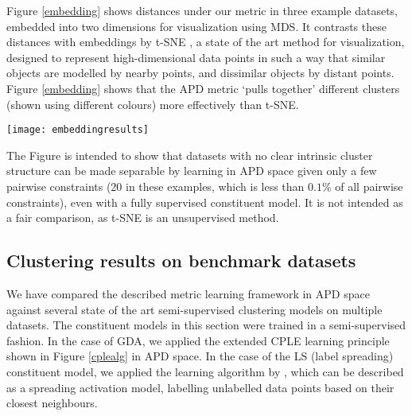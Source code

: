 Figure \ref{embedding} shows distances under our metric in three example datasets, embedded into two dimensions for visualization using MDS. It contrasts these distances with embeddings by t-SNE \citep{van2008visualizing}, a state of the art method for visualization, designed to represent high-dimensional data points in such a way that similar objects are modelled by nearby points, and dissimilar objects by distant points. Figure \ref{embedding} shows that the APD metric `pulls together' different clusters (shown using different colours) more effectively than t-SNE. 

\begin{figure*}[t]
	\centering
	
	\texttt{[image: embeddingresults]}%
	
	\caption[Embedding of pairwise distances as suggested by our metric learning approach]{Embedding of pairwise distances as suggested by our metric learning approach (top) and by t-SNE (bottom) on the COIL-3 dataset (128x128px images of 3 similar-looking toy cars) used by \citep{zeng2012semi}, the ionosphere and wheat datasets from the UCI machine learning repository, and the lymphoma microarray dataset obtained from the Broad Institute. The APD plot was created using supervised GDA as the constituent model.}
	\label{embedding} 
\end{figure*}

The Figure is intended to show that datasets with no clear intrinsic cluster structure can be made separable by learning in APD space given only a few pairwise constraints (20 in these examples, which is less than $0.1 \%$ of all pairwise constraints), even with a fully supervised constituent model. It is not intended as a fair comparison, as t-SNE is an unsupervised method.

\subsection*{Clustering results on benchmark datasets}

We have compared the described metric learning framework in APD space against several state of the art semi-supervised clustering models on multiple datasets. The constituent models in this section were trained in a semi-supervised fashion. In the case of GDA, we applied the extended CPLE learning principle shown in Figure \ref{cplealg} in APD space. In the case of the LS (label spreading) constituent model, we applied the learning algorithm by \citep{zhou2004learning}, which can be described as a spreading activation model, labelling unlabelled data points based on their closest neighbours. 

